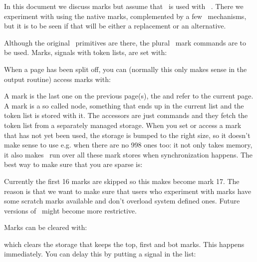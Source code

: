 In this document we discuss marks but assume that \LUAMETATEX\ is used with
\CONTEXT\ \LMTX. There we experiment with using the native marks, complemented by
a few \LUA\ mechanisms, but it is to be seen if that will be either a replacement
or an alternative.

\stopsectionlevel

\startsectionlevel[title=The basics]

Although the original \TEX\ primitives are there, the plural \ETEX\ mark commands
are to be used. Marks, signals with token lists, are set with:

\starttyping[option=TEX]
\stoptyping

When a page has been split off, you can (normally this only makes sense in the
output routine) access marks with:

\starttyping[option=TEX]
\stoptyping

A  mark is the last one on the previous page(s), the 
and  refer to the current page. A mark is a so called node,
something that ends up in the current list and the token list is stored with it.
The accessors are just commands and they fetch the token list from a separately
managed storage. When you set or access a mark that has not yet been used, the
storage is bumped to the right size, so it doesn't make sense to use e.g. \type
{} when there are no 998 ones too: it not only takes memory, it also
makes \TEX\ run over all these mark stores when synchronization happens. The best
way to make sure that you are sparse is:

\starttyping[option=TEX]
\newmarks\MyMark
\stoptyping

Currently the first 16 marks are skipped so this makes \type {\MyMark} become
mark 17. The reason is that we want to make sure that users who experiment with
marks have some scratch marks available and don't overload system defined ones.
Future versions of \CONTEXT\ might become more restrictive.

Marks can be cleared with:

\starttyping[option=TEX]
\stoptyping

which clears the storage that keeps the top, first and bot marks. This happens
immediately. You can delay this by putting a signal in the list:

\starttyping[option=TEX]
\stoptyping

